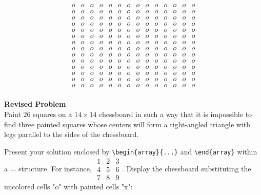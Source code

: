 $$\begin{array}{cccccccccccccc}
o & o & o & o & o & o & o & o & o & o & o & o & o & o \\
o & o & o & o & o & o & o & o & o & o & o & o & o & o \\
o & o & o & o & o & o & o & o & o & o & o & o & o & o \\
o & o & o & o & o & o & o & o & o & o & o & o & o & o \\
o & o & o & o & o & o & o & o & o & o & o & o & o & o \\
o & o & o & o & o & o & o & o & o & o & o & o & o & o \\
o & o & o & o & o & o & o & o & o & o & o & o & o & o \\
o & o & o & o & o & o & o & o & o & o & o & o & o & o \\
o & o & o & o & o & o & o & o & o & o & o & o & o & o \\
o & o & o & o & o & o & o & o & o & o & o & o & o & o \\
o & o & o & o & o & o & o & o & o & o & o & o & o & o \\
o & o & o & o & o & o & o & o & o & o & o & o & o & o \\
o & o & o & o & o & o & o & o & o & o & o & o & o & o \\
o & o & o & o & o & o & o & o & o & o & o & o & o & o \\
\end{array}$$


\textbf{Revised Problem}\\
Paint $26$ squares on a $14 \times 14$ chessboard in such a way that it is impossible to find three painted squares whose centers will form a right-angled triangle with legs parallel to the sides of the chessboard.

Present your solution enclosed by \verb|\begin{array}{...}| and \verb|\end{array}| within a $\boxed{...}$ structure. For instance, $\boxed{\begin{array}{ccc}1 & 2 & 3 \\ 4 & 5 & 6 \\ 7 & 8 & 9\end{array}}$.
Display the chessboard substituting the uncolored cells "o" with painted cells "x":

